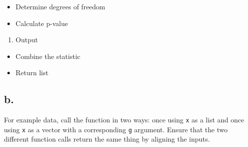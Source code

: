 \documentclass[
]{article}
\providecommand{\tightlist}{%
  \setlength{\itemsep}{0pt}\setlength{\parskip}{0pt}}
\begin{document}
\begin{itemize}
\tightlist
\item
  Determine degrees of freedom
\item
  Calculate p-value
\end{itemize}

\begin{enumerate}
\def\labelenumi{\arabic{enumi}.}
\setcounter{enumi}{4}
\tightlist
\item
  Output
\end{enumerate}

\begin{itemize}
\tightlist
\item
  Combine the statistic
\item
  Return list
\end{itemize}

\subsection{b.}\label{b.-5}

For example data, call the function in two ways: once using \texttt{x}
as a list and once using \texttt{x} as a vector with a corresponding
\texttt{g} argument. Ensure that the two different function calls return
the same thing by aligning the inputs.
\end{document}
